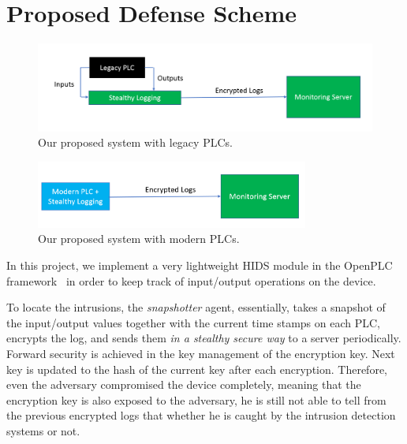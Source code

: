 \section{Proposed Defense Scheme}

\begin{figure}[h]
  \centering
    \includegraphics[width=\textwidth]{figs/legacy_system}
    \caption{Our proposed system with legacy PLCs.}
    \label{fig:legacy}
\end{figure}

\begin{figure}[h]
  \centering
    \includegraphics[width=0.8\textwidth]{figs/modern_system}
    \caption{Our proposed system with modern PLCs.}
    \label{fig:modern}
\end{figure}


In this project, we implement a very lightweight HIDS module in the OpenPLC framework~\cite{alves2014openplc} in order to keep track of input/output operations on the device.

To locate the intrusions, the \emph{snapshotter} agent, essentially, takes a snapshot of the input/output values together with the current time stamps on each PLC, encrypts the log, and sends them \emph{in a stealthy secure way} to a server periodically. Forward security is achieved in the key management of the encryption key. Next key is updated to the hash of the current key after each encryption. Therefore, even the adversary compromised the device completely, meaning that the encryption key is also exposed to the adversary, he is still not able to tell from the previous encrypted logs that whether he is caught by the intrusion detection systems or not.   

